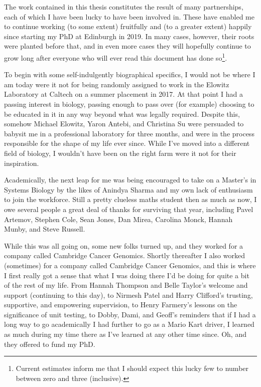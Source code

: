\documentclass[../thesis.tex]{subfiles}
\begin{document}
The work contained in this thesis constitutes the result of many partnerships, each of which I have been lucky to have been involved in. These have enabled me to continue working (to some extent) fruitfully and (to a greater extent) happily since starting my PhD at Edinburgh in 2019. In many cases, however, their roots were planted before that, and in even more cases they will hopefully continue to grow long after everyone who will ever read this document has done so\footnote{Current estimates inform me that I should expect this lucky few to number between zero and three (inclusive).}. 

To begin with some self-indulgently biographical specifics, I would not be where I am today were it not for being randomly assigned to work in the Elowitz Laboratory at Caltech on a summer placement in 2017. At that point I had a passing interest in biology, passing enough to pass over (for example) choosing to be educated in it in any way beyond what was legally required. Despite this, somehow Michael Elowitz, Yaron Antebi, and Christina Su were persuaded to babysit me in a professional laboratory for three months, and were in the process responsible for the shape of my life ever since. While I've moved into a different field of biology, I wouldn't have been on the right farm were it not for their inspiration.

Academically, the next leap for me was being encouraged to take on a Master's in Systems Biology by the likes of Anindya Sharma and my own lack of enthusiasm to join the workforce. Still a pretty clueless maths student then as much as now, I owe several people a great deal of thanks for surviving that year, including Pavel Artemov, Stephen Cole, Sean Jones, Dan Mirea, Carolina Monck, Hannah Munby, and Steve Russell.

While this was all going on, some new folks turned up, and they worked for a company called Cambridge Cancer Genomics. Shortly thereafter I also worked (sometimes) for a company called Cambridge Cancer Genomics, and this is where I first really got a sense that what I was doing there I'd be doing for quite a bit of the rest of my life. From Hannah Thompson and Belle Taylor's welcome and support (continuing to this day), to Nirmesh Patel and Harry Clifford's trusting, supportive, and empowering supervision, to Henry Farmery's lessons on the significance of unit testing, to Dobby, Dami, and Geoff's reminders that if I had a long way to go academically I had further to go as a Mario Kart driver, I learned as much during my time there as I've learned at any other time since. Oh, and they offered to fund my PhD.
\end{document}
